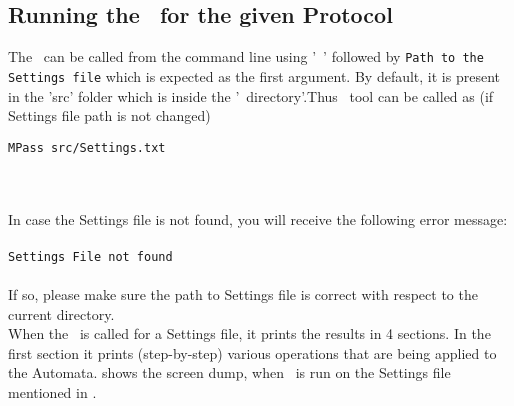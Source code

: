 \subsection{Running the \MPass\ for the given Protocol}
The \MPass\ can be called from the command line using '\MPass\ '  followed by {\tt Path to the Settings file} which is expected as the first argument.  By default, it is present in the 'src' folder which is inside the '\MPass\ directory'.Thus \MPass\ tool can be called as (if Settings file path is not changed)
\begin{verbatim}
MPass src/Settings.txt
\end{verbatim}\\\\
In case the Settings file is not found, you will receive the following error message:\\\\
{\tt Settings File not found\\}
\\
If so, please make sure the path to Settings file is correct with respect to the current directory.\\
When the \MPass\ is called for a Settings file, it prints the results in 4 sections. In the first section it prints (step-by-step) various operations that are being applied to the Automata.
 shows the screen dump, when \MPass\ is run on the Settings file mentioned in .\\
